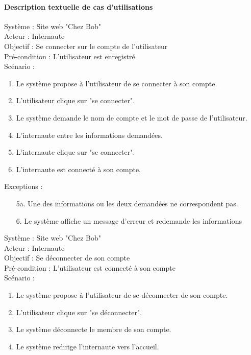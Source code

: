 \documentclass{report}
\begin{document}
\paragraph{Description textuelle de cas d'utilisations}


\indent
\newline
Système : Site web "Chez Bob"\\
Acteur : Internaute\\
Objectif : Se connecter sur le compte de l'utilisateur\\
Pré-condition : L'utilisateur est enregistré\\
Scénario : 
\begin{enumerate}
\item Le système propose à l'utilisateur de se connecter à son compte.
\item L'utilisateur clique sur "se connecter".
\item Le système demande le nom de compte et le mot de passe de l'utilisateur.
\item L'internaute entre les informations demandées.
\item L'internaute clique sur "se connecter".
\item L'internaute est connecté à son compte.
\end{enumerate}
\indent
\newline
Exceptions : 
\begin{itemize}
\item[5a.] Une des informations ou les deux demandées ne correspondent pas.
\item[6.] Le système affiche un message d'erreur et redemande les informations
\end{itemize}
\indent
\newline
\newline
Système : Site web "Chez Bob"\\
Acteur : Internaute\\
Objectif : Se déconnecter de son compte\\
Pré-condition : L'utilisateur est connecté à son compte\\
Scénario : 
\begin{enumerate}
\item Le système propose à l'utilisateur de se déconnecter de son compte.
\item L'utilisateur clique sur "se déconnecter".
\item Le système déconnecte le membre de son compte.
\item Le système redirige l'internaute vers l'accueil.
\end{enumerate}
\end{document}
